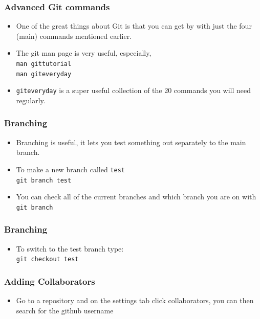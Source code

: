 \documentclass{beamer}
\begin{document}
\begin{frame}
\frametitle{Advanced Git commands}
\begin{itemize}
    \item One of the great things about Git is that you can get by with just the four (main) commands mentioned earlier.
	\item The git man page is very useful, especially, \\
	\texttt{man gittutorial} \\
	\texttt{man giteveryday} \\ 
\item \texttt{giteveryday} is a super useful collection of the 20 commands you will need regularly.
\end{itemize}
\end{frame}


\begin{frame}
\frametitle{Branching}
\begin{itemize}
\item Branching is useful, it lets you test something out separately to the main branch.
\item To make a new branch called \texttt{test} \\
\texttt{git branch test} 
\item You can check all of the current branches and which branch you are on with \\
	\texttt{git branch}
\end{itemize}
\end{frame}

\begin{frame}
\frametitle{Branching}
\begin{itemize}
	\item To switch to the test branch type: \\ 
	\texttt{git checkout test} \\
\end{itemize}
\end{frame}

\begin{frame}
\frametitle{Adding Collaborators}
\begin{itemize}
	\item Go to a repository and on the settings tab click collaborators, you can then search for the github username
\end{itemize}
\end{frame}
\end{document}
